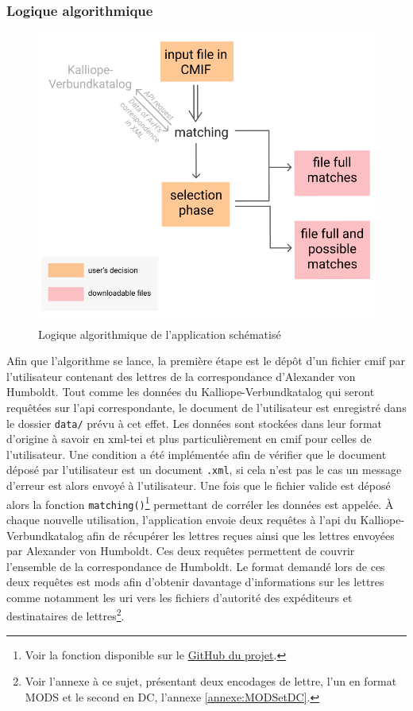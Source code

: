 \documentclass[a4paper, 12pt, twoside]{book}
\begin{document}
\subsubsection{Logique algorithmique}
 \begin{figure}[h!]
    \centering
         \includegraphics[scale=0.6]{img/schema_matching.png}
         \caption{Logique algorithmique de l'application schématisé}
         \label{fig:schemaMatching}
\end{figure}

 Afin que l'algorithme se lance, la première étape est le dépôt d'un fichier \gls{cmif} par l'utilisateur contenant des lettres de la correspondance d'Alexander von Humboldt. Tout comme les données du Kalliope-Verbundkatalog qui seront requêtées sur l'\gls{api} correspondante, le document de l'utilisateur est enregistré dans le dossier \texttt{data/} prévu à cet effet. Les données sont stockées dans leur format d'origine à savoir en \gls{xml}-\gls{tei} et plus particulièrement en \gls{cmif} pour celles de l'utilisateur. Une condition a été implémentée afin de vérifier que le document déposé par l'utilisateur est un document \texttt{.xml}, si cela n'est pas le cas un message d'erreur est alors envoyé à l'utilisateur. Une fois que le fichier valide est déposé alors la fonction \texttt{matching()}\footnote{Voir la fonction disponible sur le \href{https://github.com/edition-humboldt-collection/cS-matchingtool/blob/main/app/utils/matching.py}{GitHub du projet}.} permettant de corréler les données est appelée. À chaque nouvelle utilisation, l'application envoie deux requêtes à l'\gls{api} du Kalliope-Verbundkatalog afin de récupérer les lettres reçues ainsi que les lettres envoyées par Alexander von Humboldt. Ces deux requêtes permettent de couvrir l'ensemble de la correspondance de Humboldt. Le format demandé lors de ces deux requêtes est \gls{mods} afin d'obtenir davantage d'informations sur les lettres comme notamment les \gls{uri} vers les fichiers d'autorité des expéditeurs et destinataires de lettres\footnote{Voir l'annexe à ce sujet, présentant deux encodages de lettre, l'un en format MODS et le second en DC, l'annexe \ref{annexe:MODSetDC}.}. 
\end{document}
